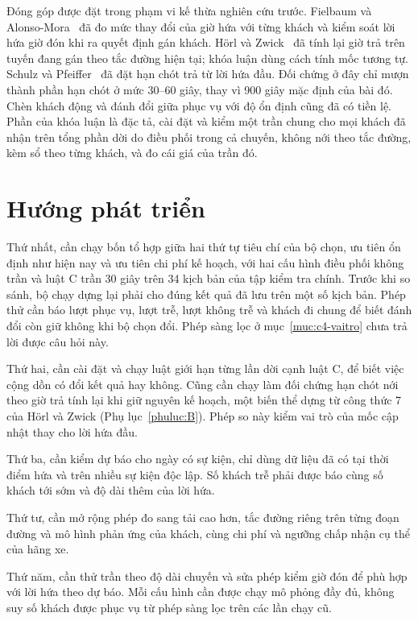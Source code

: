 Đóng góp được đặt trong phạm vi kế thừa nghiên cứu trước. Fielbaum và Alonso-Mora~\cite{fielbaum2020} đã đo mức thay đổi của giờ hứa với từng khách và kiểm soát lời hứa giờ đón khi ra quyết định gán khách. Hörl và Zwick~\cite{horl2022} đã tính lại giờ trả trên tuyến đang gán theo tắc đường hiện tại; khóa luận dùng cách tính mốc tương tự. Schulz và Pfeiffer~\cite{schulz2026} đã đặt hạn chót trả từ lời hứa đầu. Đối chứng ở đây chỉ mượn thành phần hạn chót ở mức 30--60 giây, thay vì 900 giây mặc định của bài đó. Chèn khách động và đánh đổi giữa phục vụ với độ ổn định cũng đã có tiền lệ. Phần của khóa luận là đặc tả, cài đặt và kiểm một trần chung cho mọi khách đã nhận trên tổng phần dời do điều phối trong cả chuyến, không nới theo tắc đường, kèm sổ theo từng khách, và đo cái giá của trần đó.

\section{Hướng phát triển}
\label{muc:c5-huongphattrien}

Thứ nhất, cần chạy bốn tổ hợp giữa hai thứ tự tiêu chí của bộ chọn, ưu tiên ổn định như hiện nay và ưu tiên chi phí kế hoạch, với hai cấu hình điều phối không trần và luật C trần 30 giây trên 34 kịch bản của tập kiểm tra chính. Trước khi so sánh, bộ chạy dựng lại phải cho đúng kết quả đã lưu trên một số kịch bản. Phép thử cần báo lượt phục vụ, lượt trễ, lượt không trễ và khách đi chung để biết đánh đổi còn giữ không khi bộ chọn đổi. Phép sàng lọc ở mục~\ref{muc:c4-vaitro} chưa trả lời được câu hỏi này.

Thứ hai, cần cài đặt và chạy luật giới hạn từng lần dời cạnh luật C, để biết việc cộng dồn có đổi kết quả hay không. Cũng cần chạy làm đối chứng hạn chót nới theo giờ trả tính lại khi giữ nguyên kế hoạch, một biến thể dựng từ công thức 7 của Hörl và Zwick (Phụ lục~\ref{phuluc:B}). Phép so này kiểm vai trò của mốc cập nhật thay cho lời hứa đầu.

Thứ ba, cần kiểm dự báo cho ngày có sự kiện, chỉ dùng dữ liệu đã có tại thời điểm hứa và trên nhiều sự kiện độc lập. Số khách trễ phải được báo cùng số khách tới sớm và độ dài thêm của lời hứa.

Thứ tư, cần mở rộng phép đo sang tải cao hơn, tắc đường riêng trên từng đoạn đường và mô hình phản ứng của khách, cùng chi phí và ngưỡng chấp nhận cụ thể của hãng xe.

Thứ năm, cần thử trần theo độ dài chuyến và sửa phép kiểm giờ đón để phù hợp với lời hứa theo dự báo. Mỗi cấu hình cần được chạy mô phỏng đầy đủ, không suy số khách được phục vụ từ phép sàng lọc trên các lần chạy cũ.
